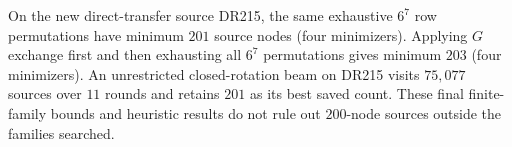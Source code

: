 On the new direct-transfer source DR215, the same exhaustive $6^7$ row
permutations have minimum $201$ source nodes (four minimizers). Applying
$G$ exchange first and then exhausting all $6^7$ permutations gives minimum
$203$ (four minimizers). An unrestricted closed-rotation beam on DR215 visits
$75{,}077$ sources over $11$ rounds and retains $201$ as its best saved
count. These final finite-family bounds and heuristic results do not rule
out $200$-node sources outside the families searched.
